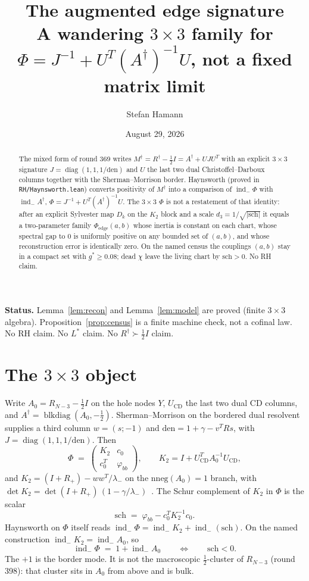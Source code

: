 \documentclass[11pt]{article}
\title{\bfseries The augmented edge signature\\[2mm]
\large A wandering $3\times 3$ family for
$\Phi=J^{-1}+U^{T}(A^{\dagger})^{-1}U$,
not a fixed matrix limit}
\author{Stefan Hamann}
\date{August 29, 2026}
\theoremstyle{remark}
\newcommand{\indm}{\operatorname{ind}_{-}}
\newcommand{\half}{\tfrac12}
\begin{document}
\maketitle

\begin{abstract}\noindent
The mixed form of round 369 writes
$M^{\dagger}=R^{\dagger}-\half I=A^{\dagger}+UJU^{T}$
with an explicit $3\times 3$ signature $J=\operatorname{diag}(1,1,1/\mathrm{den})$
and $U$ the last two dual Christoffel--Darboux columns together
with the Sherman--Morrison border.
Haynsworth (proved in \texttt{RH/Haynsworth.lean}) converts
positivity of $M^{\dagger}$ into a comparison of
$\indm\Phi$ with $\indm A^{\dagger}$,
$\Phi=J^{-1}+U^{T}(A^{\dagger})^{-1}U$.
The $3\times 3$ $\Phi$ is not a restatement of that identity:
after an explicit Sylvester map $D_{k}$ on the $K_{2}$ block
and a scale $d_{3}=1/\sqrt{|\mathrm{sch}|}$ it equals a
two-parameter family $\Phi_{\mathrm{edge}}(a,b)$ whose
inertia is constant on each chart, whose spectral gap to $0$
is uniformly positive on any bounded set of $(a,b)$, and
whose reconstruction error is identically zero.
On the named census the couplings $(a,b)$ stay in a compact
set with $g^{*}\ge 0.08$; dead $\chi$ leave the living chart
by $\mathrm{sch}>0$.
No RH claim.
\end{abstract}

\medskip\noindent
\textbf{Status.}\enspace
Lemma~\ref{lem:recon} and Lemma~\ref{lem:model} are proved
(finite $3\times 3$ algebra).
Proposition~\ref{prop:census} is a finite machine check, not a
cofinal law.
No RH claim.  No $L^{*}$ claim.  No $R^{\dagger}\succ\half I$ claim.

\section{The $3\times 3$ object}\label{sec:obj}

Write $A_{0}=R_{N-3}-\half I$ on the hole nodes $Y$,
$U_{\mathrm{CD}}$ the last two dual CD columns, and
$A^{\dagger}=\operatorname{blkdiag}(A_{0},-\half)$.
Sherman--Morrison on the bordered dual resolvent supplies a
third column $w=(s;-1)$ and $\mathrm{den}=1+\gamma-v^{T}Rs$,
with $J=\operatorname{diag}(1,1,1/\mathrm{den})$.
Then~\cite{r369}
\[
\Phi
\;=\;
\begin{pmatrix} K_{2} & c_{0}\\ c_{0}^{T} & \varphi_{bb}\end{pmatrix},
\qquad
K_{2}=I+U_{\mathrm{CD}}^{T}A_{0}^{-1}U_{\mathrm{CD}},
\]
and $K_{2}=(I+R_{+})-ww^{T}/\lambda_{-}$ on the $\mathrm{nneg}(A_{0})=1$
branch, with
$\det K_{2}=\det(I+R_{+})\,(1-\gamma/\lambda_{-})$~\cite{r375}.
The Schur complement of $K_{2}$ in $\Phi$ is the scalar
\[
\mathrm{sch}
\;=\;
\varphi_{bb}-c_{0}^{T}K_{2}^{-1}c_{0}.
\]
Haynsworth on $\Phi$ itself reads
$\indm\Phi=\indm K_{2}+\indm(\mathrm{sch})$.
On the named construction $\indm K_{2}=\indm A_{0}$, so
\begin{equation}\label{eq:shift}
\indm\Phi
\;=\;
1+\indm A_{0}
\qquad\Longleftrightarrow\qquad
\mathrm{sch}<0.
\end{equation}
The $+1$ is the border mode.  It is not the macroscopic
$\tfrac12$-cluster of $R_{N-3}$ (round 398): that cluster sits
in $A_{0}$ from above and is bulk.
\end{document}

